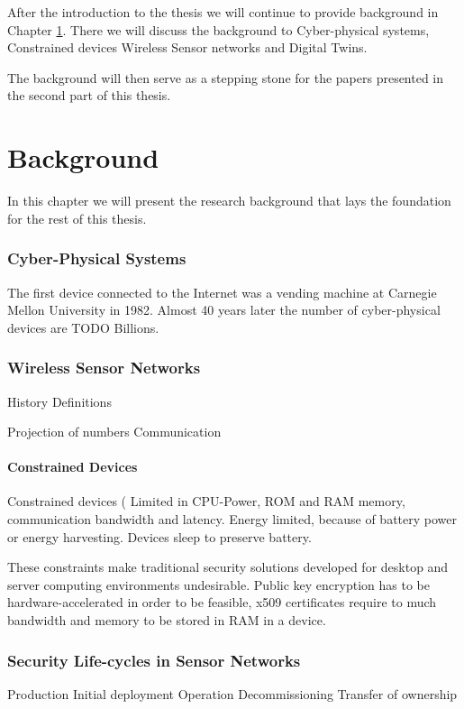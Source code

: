 After the introduction to the thesis we will continue to provide background in Chapter \ref{ch:background}. There we will discuss the background to Cyber-physical systems, Constrained devices Wireless Sensor networks and Digital Twins. 

The background will then serve as a stepping stone for the papers presented in the second part of this thesis. 


\chapter{Background}
\label{ch:background}
In this chapter we will present the research background that lays the foundation for the rest of this thesis. 
\subsection{Cyber-Physical Systems}
\label{sec:cps}
The first device connected to the Internet was a vending machine at Carnegie Mellon University in 1982. Almost 40 years later the number of cyber-physical devices are TODO Billions. 

\subsection{Wireless Sensor Networks}
History
Definitions

Projection of numbers
Communication

\subsubsection{Constrained Devices}
\label{sec:constrained_devices}
Constrained devices (\cite{rfc7228}
Limited in CPU-Power, ROM and RAM memory, communication bandwidth and latency. Energy limited, because of battery power or energy harvesting.
Devices sleep to preserve battery.

These constraints make traditional security solutions developed for desktop and server computing environments undesirable. Public key encryption has to be hardware-accelerated in order to be feasible, x509 certificates require to much bandwidth and memory to be stored in RAM in a device. 


\subsection{Security Life-cycles in Sensor Networks}
Production
Initial deployment
Operation
Decommissioning
Transfer of ownership

